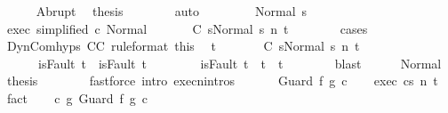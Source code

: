 \begin{isabellebody}
\ \ \ \ \isamarkupfalse%
\ Abrupt\ \isamarkupfalse%
\ {\isacharquery}thesis\isanewline
\ \ \ \ \ \ \isamarkupfalse%
\ auto\isanewline
\ \ \isamarkupfalse%
\isanewline
\ \ \ \ \isamarkupfalse%
\ {\isacharparenleft}Normal\ s{\isacharprime}{\isacharparenright}\isanewline
\ \ \ \ \isamarkupfalse%
\ exec\ {\isacharbrackleft}simplified\ c\ Normal{\isacharbrackright}\ \isanewline
\ \ \ \ \isamarkupfalse%
\ {\isachardoublequoteopen}{\isasymGamma}{\isasymturnstile}{\isasymlangle}C\ s{\isacharprime}{\isacharcomma}Normal\ s{\isacharprime}{\isasymrangle}\ {\isacharequal}n{\isasymRightarrow}\ t{\isachardoublequoteclose}\isanewline
\ \ \ \ \ \ \isamarkupfalse%
\ cases\isanewline
\ \ \ \ \isamarkupfalse%
\ DynCom{\isachardot}hyps\ C{\isacharunderscore}C{\isacharprime}\ {\isacharbrackleft}rule{\isacharunderscore}format{\isacharbrackright}\ this\ \isamarkupfalse%
\ t{\isacharprime}\ \isanewline
\ \ \ \ \ \ {\isachardoublequoteopen}{\isasymGamma}{\isasymturnstile}{\isasymlangle}C{\isacharprime}\ s{\isacharprime}{\isacharcomma}Normal\ s{\isacharprime}{\isasymrangle}\ {\isacharequal}n{\isasymRightarrow}\ t{\isacharprime}{\isachardoublequoteclose}\isanewline
\ \ \ \ \ \ {\isachardoublequoteopen}isFault\ t\ {\isasymlongrightarrow}\ isFault\ t{\isacharprime}{\isachardoublequoteclose}\ \isanewline
\ \ \ \ \ \ {\isachardoublequoteopen}{\isasymnot}\ isFault\ t{\isacharprime}\ {\isasymlongrightarrow}\ t{\isacharprime}\ {\isacharequal}\ t{\isachardoublequoteclose}\isanewline
\ \ \ \ \ \ \isamarkupfalse%
\ blast\isanewline
\ \ \ \ \isamarkupfalse%
\ Normal\ \isamarkupfalse%
\ {\isacharquery}thesis\isanewline
\ \ \ \ \ \ \isamarkupfalse%
\ {\isacharparenleft}fastforce\ intro{\isacharcolon}\ execn{\isachardot}intros{\isacharparenright}\isanewline
\ \ \isamarkupfalse%
\isanewline
{}\isamarkupfalse%
\isanewline
\ \ \isamarkupfalse%
\ {\isacharparenleft}Guard\ f{\isacharprime}\ g{\isacharprime}\ c{\isacharprime}{\isacharparenright}\isanewline
\ \ \isamarkupfalse%
\ exec{\isacharcolon}\ {\isachardoublequoteopen}{\isasymGamma}{\isasymturnstile}{\isasymlangle}c{\isacharcomma}s{\isasymrangle}\ {\isacharequal}n{\isasymRightarrow}\ t{\isachardoublequoteclose}\ \isamarkupfalse%
\ fact\isanewline
\ \ \isamarkupfalse%
\ {\isachardoublequoteopen}c\ {\isasymsubseteq}\isactrlsub g\ Guard\ f{\isacharprime}\ g{\isacharprime}\ c{\isacharprime}{\isachardoublequoteclose}\ \isamarkupfalse%

\end{isabellebody}
